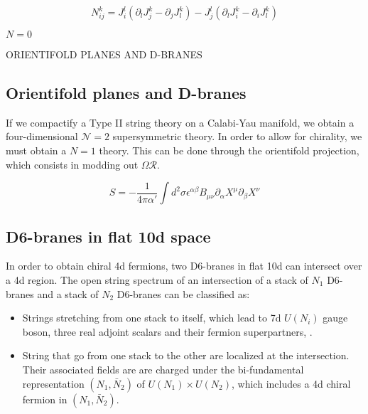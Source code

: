
\begin{equation}
  N^k_{ij}= J^l_i(\partial_l J^k_j - \partial_j J^k_l) - J_j^l (\partial_l J^k_i - \partial_i J^k_l)
\end{equation}

$N=0$





ORIENTIFOLD PLANES AND D-BRANES

\subsection{Orientifold planes and D-branes}

If we compactify a Type II string theory on a Calabi-Yau manifold, we  obtain a four-dimensional
$\mathcal N=2$ supersymmetric theory.
In order to allow for chirality, we must obtain a $N=1$ theory. This can be done through the orientifold
projection, which consists in modding out $\Omega \mathcal R$.


\begin{equation}
  S= -\frac{1}{4\pi \alpha'}\int d^2\sigma \epsilon^{\alpha\beta} B_{\mu\nu}  \partial_\alpha X^\mu \partial_\beta X^\nu
\end{equation}

\subsection{D6-branes in flat 10d space}


In order to obtain chiral 4d fermions, two D6-branes in flat 10d can intersect over a 4d region.
The open string spectrum of an intersection of a stack of $N_1$ D6-branes and a stack of $N_2$ D6-branes
can be classified as:

\begin{itemize}
  \item Strings stretching from one stack to itself, which lead to 7d $U(N_i)$ gauge boson, three real
    adjoint scalars and their fermion superpartners, .
  \item String that go from one stack to the other are localized at the intersection. 
    Their associated fields are are charged under the bi-fundamental representation $(N_1, \bar N_2)$ of 
    $U(N_1)\times U(N_2)$, which includes a 4d chiral fermion in $(N_1,\bar N_2)$.
\end{itemize}

